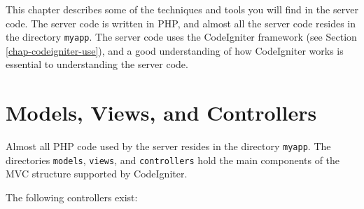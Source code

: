 \documentclass[11pt,oneside,a4paper]{memoir}
\begin{document}
This chapter describes some of the techniques and tools you will find in the server code. The server
code is written in PHP, and almost all the server code resides in the directory
\texttt{myapp}. The server code uses the CodeIgniter framework (see Section
\ref{chap-codeigniter-use}), and a good understanding of how CodeIgniter works is essential to
understanding the server code.

\section{Models, Views, and Controllers}

Almost all PHP code used by the server resides in the directory \texttt{myapp}. The directories
\texttt{models}, \texttt{views}, and \texttt{controllers} hold the main components of the MVC
structure supported by CodeIgniter.

The following controllers exist:
\end{document}

